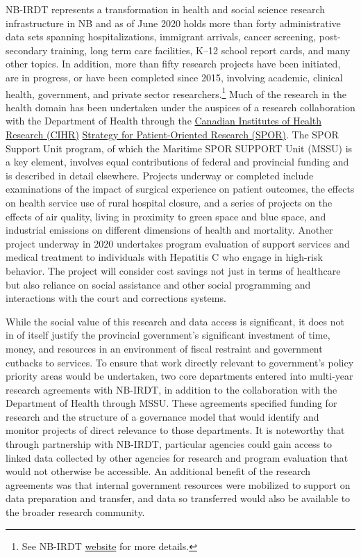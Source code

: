 NB-IRDT represents a transformation in health and social science research infrastructure in NB and as of June 2020 holds more than forty administrative data sets spanning hospitalizations, immigrant arrivals, cancer screening, post-secondary training, long term care facilities, K--12 school report cards, and many other topics. In addition, more than fifty research projects have been initiated, are in progress, or have been completed since 2015, involving academic, clinical health, government, and private sector researchers.\footnote{See NB-IRDT \href{https://www.unb.ca/nbirdt/}{website} for more details.} Much of the research in the health domain has been undertaken under the auspices of a research collaboration with the Department of Health through the \href{https://cihr-irsc.gc.ca/e/45859.html}{Canadian Institutes of Health Research (CIHR)} \href{http://www.spor-maritime-srap.ca/}{Strategy for Patient-Oriented Research (SPOR)}. The SPOR Support Unit program, of which the Maritime SPOR SUPPORT Unit (MSSU) is a key element, involves equal contributions of federal and provincial funding and is described in detail elsewhere. Projects underway or completed include examinations of the impact of surgical experience on patient outcomes, the effects on health service use of rural hospital closure, and a series of projects on the effects of air quality, living in proximity to green space and blue space, and industrial emissions on different dimensions of health and mortality. Another project underway in 2020 undertakes program evaluation of support services and medical treatment to individuals with Hepatitis C who engage in high-risk behavior. The project will consider cost savings not just in terms of healthcare but also reliance on social assistance and other social programming and interactions with the court and corrections systems.

While the social value of this research and data access is significant, it does not in of itself justify the provincial government's significant investment of time, money, and resources in an environment of fiscal restraint and government cutbacks to services. To ensure that work directly relevant to government's policy priority areas would be undertaken, two core departments entered into multi-year research agreements with NB-IRDT, in addition to the collaboration with the Department of Health through MSSU. These agreements specified funding for research and the structure of a governance model that would identify and monitor projects of direct relevance to those departments. It is noteworthy that through partnership with NB-IRDT, particular agencies could gain access to linked data collected by other agencies for research and program evaluation that would not otherwise be accessible. An additional benefit of the research agreements was that internal government resources were mobilized to support on data preparation and transfer, and data so transferred would also be available to the broader research community.

